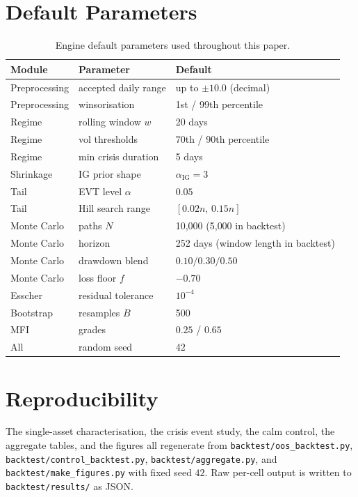 \documentclass[11pt]{article}
\theoremstyle{definition}
\begin{document}
\appendix
\section{Default Parameters}
\label{app:params}
\begin{table}[h]
\centering
\caption{Engine default parameters used throughout this paper.}
\begin{tabular}{lll}
\toprule
Module & Parameter & Default \\
\midrule
Preprocessing   & accepted daily range & up to $\pm10.0$ (decimal) \\
Preprocessing   & winsorisation        & 1st / 99th percentile \\
Regime          & rolling window $w$   & 20 days \\
Regime          & vol thresholds       & 70th / 90th percentile \\
Regime          & min crisis duration  & 5 days \\
Shrinkage       & IG prior shape       & $\alpha_{\mathrm{IG}}=3$ \\
Tail            & EVT level $\alpha$    & $0.05$ \\
Tail            & Hill search range    & $[0.02n,\,0.15n]$ \\
Monte Carlo     & paths $N$            & 10{,}000 (5{,}000 in backtest) \\
Monte Carlo     & horizon              & 252 days (window length in backtest) \\
Monte Carlo     & drawdown blend       & $0.10 / 0.30 / 0.50$ \\
Monte Carlo     & loss floor $f$        & $-0.70$ \\
Esscher         & residual tolerance   & $10^{-4}$ \\
Bootstrap       & resamples $B$        & 500 \\
MFI             & grades               & $0.25$ / $0.65$ \\
All             & random seed          & 42 \\
\bottomrule
\end{tabular}
\end{table}

\section{Reproducibility}
\label{app:repro}
The single-asset characterisation, the crisis event study, the calm control, the
aggregate tables, and the figures all regenerate from
\texttt{backtest/oos\_backtest.py}, \texttt{backtest/control\_backtest.py},
\texttt{backtest/aggregate.py}, and \texttt{backtest/make\_figures.py} with fixed
seed $42$. Raw per-cell output is written to \texttt{backtest/results/} as JSON.
\end{document}
